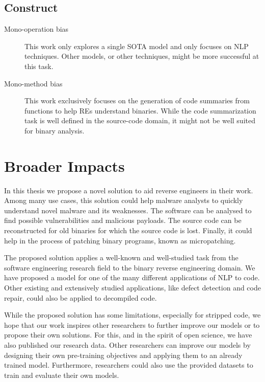\subsection{Construct}
    \begin{description}
        \item[Mono-operation bias] This work only explores a single SOTA model and only focuses on NLP techniques. Other models, or other techniques, might be more successful at this task.
        \item[Mono-method bias] This work exclusively focuses on the generation of code summaries from functions to help REs understand binaries. While the code summarization task is well defined in the source-code domain, it might not be well suited for binary analysis.
    \end{description}


\section{Broader Impacts}
In this thesis we propose a novel solution to aid reverse engineers in their work. Among many use cases, this solution could help malware analysts to quickly understand novel malware and its weaknesses. The software can be analysed to find possible vulnerabilities and malicious payloads. The source code can be reconstructed for old binaries for which the source code is lost. Finally, it could help in the process of patching binary programs, known as micropatching.

The proposed solution applies a well-known and well-studied task from the software engineering research field to the binary reverse engineering domain. We have proposed a model for one of the many different applications of NLP to code. Other existing and extensively studied applications, like defect detection and code repair, could also be applied to decompiled code. 

While the proposed solution has some limitations, especially for stripped code, we hope that our work inspires other researchers to further improve our models or to propose their own solutions. For this, and in the spirit of open science, we have also published our research data. Other researchers can improve our models by designing their own pre-training objectives and applying them to an already trained model. Furthermore, researchers could also use the provided datasets to train and evaluate their own models.



